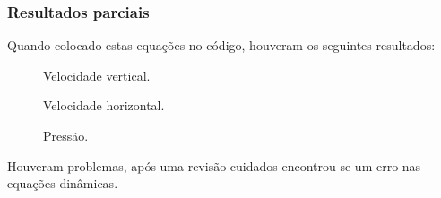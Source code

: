 \documentclass[xcolor=dvipsnames,10pt,aspectratio=169]{beamer}
\begin{document}
	\begin{frame}
		\frametitle{Resultados parciais}
		Quando colocado estas equações no código, houveram os seguintes resultados:\\
		\vspace{1cm}
		\begin{minipage}[h!]{0.31\textwidth}
			\begin{figure}
				\label{gif1}
				\caption{Velocidade vertical.}
			\end{figure}
		\end{minipage}
		\begin{minipage}[h!]{0.31\textwidth}
			\begin{figure}
				\label{gif2}
				\caption{Velocidade horizontal.}
			\end{figure}
		\end{minipage}
		\begin{minipage}[h!]{0.31\textwidth}
			\begin{figure}
				\label{gif3}
				\caption{Pressão.}
			\end{figure}
		\end{minipage}
	
	Houveram problemas, após uma revisão cuidados encontrou-se um erro nas equações dinâmicas.

	\end{frame}
\end{document}

